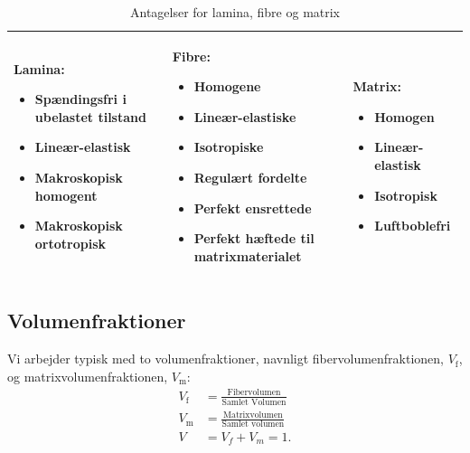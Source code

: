 \begin{table}[htbp]
  \centering
  \caption{Antagelser for lamina, fibre og matrix}
  \label{tab:lamina-antagelser}

  \begin{tabularx}{\textwidth}{
    |>{\raggedright\arraybackslash}X
    |>{\raggedright\arraybackslash}X
    |>{\raggedright\arraybackslash}X|
  }
    \hline

    \textbf{Lamina:}
    \begin{itemize}[leftmargin=*, nosep]
      \item Spændingsfri i ubelastet tilstand
      \item Lineær-elastisk
      \item Makroskopisk homogent
      \item Makroskopisk ortotropisk
    \end{itemize}

    &

    \textbf{Fibre:}
    \begin{itemize}[leftmargin=*, nosep]
      \item Homogene
      \item Lineær-elastiske
      \item Isotropiske
      \item Regulært fordelte
      \item Perfekt ensrettede
      \item Perfekt hæftede til matrixmaterialet
    \end{itemize}

    &

    \textbf{Matrix:}
    \begin{itemize}[leftmargin=*, nosep]
      \item Homogen
      \item Lineær-elastisk
      \item Isotropisk
      \item Luftboblefri
    \end{itemize}

    \\
    \hline
  \end{tabularx}
\end{table}

\subsection{Volumenfraktioner}
Vi arbejder typisk med to volumenfraktioner, navnligt fibervolumenfraktionen, $V_{\mathrm{f}}$, og matrixvolumenfraktionen, $V_{\mathrm{m}}$:
\begin{align*}
  V_{\mathrm{f}} &= \frac{\text{Fibervolumen}}{\text{Samlet Volumen}} \\
  V_{\mathrm{m}} &= \frac{\text{Matrixvolumen}}{\text{Samlet volumen}} \\
  V &= V_f + V_m = 1
.\end{align*}

